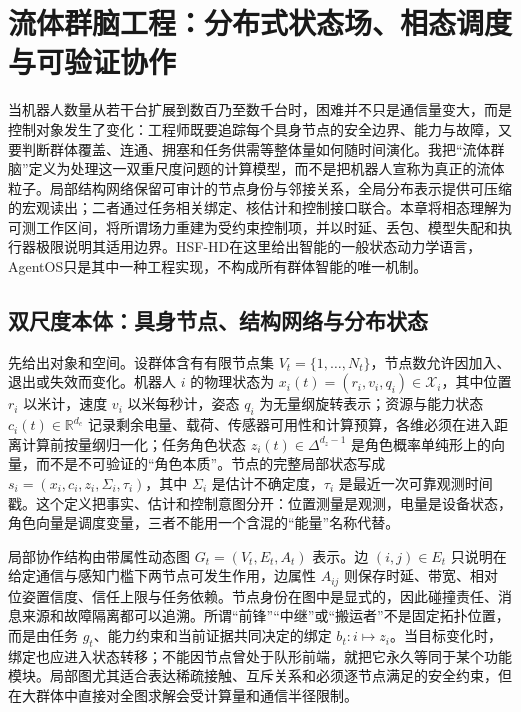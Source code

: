 \chapter{流体群脑工程：分布式状态场、相态调度与可验证协作}
\label{chp:fluid_swarm_engineering}

当机器人数量从若干台扩展到数百乃至数千台时，困难并不只是通信量变大，而是控制对象发生了变化：工程师既要追踪每个具身节点的安全边界、能力与故障，又要判断群体覆盖、连通、拥塞和任务供需等整体量如何随时间演化。我把“流体群脑”定义为处理这一双重尺度问题的计算模型，而不是把机器人宣称为真正的流体粒子。局部结构网络保留可审计的节点身份与邻接关系，全局分布表示提供可压缩的宏观读出；二者通过任务相关绑定、核估计和控制接口联合。本章将相态理解为可测工作区间，将所谓场力重建为受约束控制项，并以时延、丢包、模型失配和执行器极限说明其适用边界。HSF-HD在这里给出智能的一般状态动力学语言，AgentOS只是其中一种工程实现，不构成所有群体智能的唯一机制。

\section{双尺度本体：具身节点、结构网络与分布状态}
\label{sec:ontology_reconstruction}

先给出对象和空间。设群体含有有限节点集 $V_t=\{1,\ldots,N_t\}$，节点数允许因加入、退出或失效而变化。机器人 $i$ 的物理状态为 $x_i(t)=(r_i,v_i,q_i)\in\mathcal X_i$，其中位置 $r_i$ 以米计，速度 $v_i$ 以米每秒计，姿态 $q_i$ 为无量纲旋转表示；资源与能力状态 $c_i(t)\in\mathbb R^{d_c}$ 记录剩余电量、载荷、传感器可用性和计算预算，各维必须在进入距离计算前按量纲归一化；任务角色状态 $z_i(t)\in\Delta^{d_z-1}$ 是角色概率单纯形上的向量，而不是不可验证的“角色本质”。节点的完整局部状态写成 $s_i=(x_i,c_i,z_i,\Sigma_i,\tau_i)$，其中 $\Sigma_i$ 是估计不确定度，$\tau_i$ 是最近一次可靠观测时间戳。这个定义把事实、估计和控制意图分开：位置测量是观测，电量是设备状态，角色向量是调度变量，三者不能用一个含混的“能量”名称代替。

局部协作结构由带属性动态图 $G_t=(V_t,E_t,A_t)$ 表示。边 $(i,j)\in E_t$ 只说明在给定通信与感知门槛下两节点可发生作用，边属性 $A_{ij}$ 则保存时延、带宽、相对位姿置信度、信任上限与任务依赖。节点身份在图中是显式的，因此碰撞责任、消息来源和故障隔离都可以追溯。所谓“前锋”“中继”或“搬运者”不是固定拓扑位置，而是由任务 $g_t$、能力约束和当前证据共同决定的绑定 $b_t:i\mapsto z_i$。当目标变化时，绑定也应进入状态转移；不能因节点曾处于队形前端，就把它永久等同于某个功能模块。局部图尤其适合表达稀疏接触、互斥关系和必须逐节点满足的安全约束，但在大群体中直接对全图求解会受计算量和通信半径限制。

